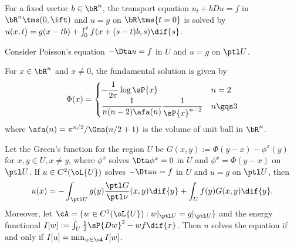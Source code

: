 \documentclass[article, a4paper, twoside]{universal}
\begin{document}

\begin{thm}
    For a fixed vector $b\in\bR^{n}$, the transport equation $u_{t}+bDu=f$ in $\bR^{n}\tms(0,\ift)$ and $u=g$ on $\bR\tms\{t=0\}$ is solved by $u(x,t)=g(x-tb)+\int_{0}^{t}f(x+(s-t)b,s)\dif{s}$.
\end{thm}


\begin{thm}
    Consider Poisson's equation $-\Dta u=f$ in $U$ and $u=g$ on $\ptl U$.

    For $x\in\bR^{n}$ and $x\neq 0$, the fundamental solution is given by
    \[
        \Phi(x)=\begin{cases}
          -\dfrac{1}{2\pi}\log\sP{x} & n = 2 \\
          \dfrac{1}{n(n-2)\afa(n)}\dfrac{1}{\sP{x}^{n-2}} & n\gqs3
        \end{cases}
    \]
    where $\afa(n)=\pi^{n/2}/\Gma(n/2+1)$ is the volume of unit ball in $\bR^{n}$.

    Let the Green's function for the region $U$ be $G(x,y):=\Phi(y-x)-\phi^{x}(y)$ for $x,y\in U, x\neq y$, where $\phi^{x}$ solves $\Dta\phi^{x}=0$ in $U$ and $\phi^{x}=\Phi(y-x)$ on $\ptl U$. If $u\in C^{2}(\oL{U})$ solves $-\Dta u=f$ in $U$ and $u=g$ on $\ptl U$, then
    \[
        u(x)=-\int_{\ptl U}g(y)\frac{\ptl G}{\ptl \nu}(x,y)\dif{y}+\int_{U}f(y)G(x,y)\dif{y}.
    \]
    Moreover, let $\cA=\{w\in C^{2}(\oL{U}):w|_{\ptl U}=g|_{\ptl U}\}$ and the energy functional $I[w]:=\int_{U}\frac{1}{2}\sP{Dw}^{2}-wf\dif{x}$. Then $u$ solves the equation if and only if $I[u]=\min_{w\in\cA}I[w]$.
\end{thm}
\end{document}
